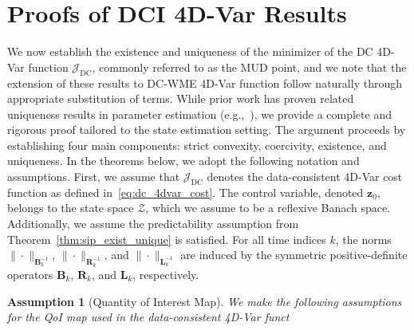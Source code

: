 \documentclass[final,1p,times]{elsarticle}
\newtheorem{assumption}{Assumption}
\begin{document}

\section{Proofs of DCI 4D-Var Results}
We now establish the existence and uniqueness of the minimizer of the DC 4D-Var function $ \mathcal{J}_{\mathrm{DC}} $, commonly referred to as the MUD point, and we note that the extension of these results to DC-WME 4D-Var function follow naturally through appropriate substitution of terms.
While prior work has proven related uniqueness results in parameter estimation (e.g.,~\cite{Pilosov2023}), we provide a complete and rigorous proof tailored to the state estimation setting. 
The argument proceeds by establishing four main components: strict convexity, coercivity, existence, and uniqueness.  
In the theorems below, we adopt the following notation and assumptions. 
First, we assume that $ \mathcal{J}_{\mathrm{DC}} $ denotes the data-consistent 4D-Var cost function as defined in~\eqref{eq:dc_4dvar_cost}. 
The control variable, denoted $ \mathbf{z}_0 $, belongs to the state space $ \mathcal{Z} $, which we assume to be a reflexive Banach space. 
Additionally, we assume the predictability assumption from Theorem~\ref{thm:sip_exist_unique} is satisfied. 
For all time indices $ k $, the norms $ \| \cdot \|_{\mathbf{B}^{-1}_k} $, $ \| \cdot \|_{\mathbf{R}^{-1}_k} $, and $ \| \cdot \|_{\mathbf{L}^{-1}_k} $ are induced by the symmetric positive-definite operators $ \mathbf{B}_k $, $ \mathbf{R}_k $, and $ \mathbf{L}_k $, respectively.



\begin{assumption}[Quantity of Interest Map]
We make the following assumptions for the QoI map used in the data-consistent 4D-Var funct
\end{assumption}
\end{document}
